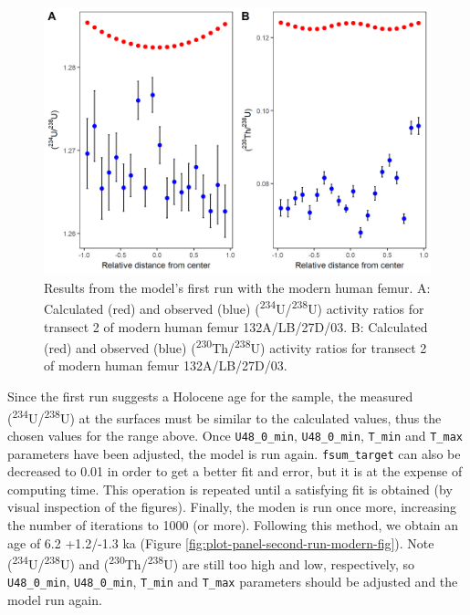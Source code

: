 \documentclass[]{elsarticle} %
\begin{document}
\begin{figure}
\includegraphics[width=0.95\linewidth]{figures/plot-panel-first-run-modern} \caption{Results from the model's first run with the modern human femur. A: Calculated (red) and observed (blue) (\textsuperscript{234}U/\textsuperscript{238}U) activity ratios for transect 2 of modern human femur 132A/LB/27D/03. B: Calculated (red) and observed (blue) (\textsuperscript{230}Th/\textsuperscript{238}U) activity ratios for transect 2 of modern human femur 132A/LB/27D/03.}\label{fig:plot-panel-first-run-modern-fig}
\end{figure}

\FloatBarrier

Since the first run suggests a Holocene age for the sample, the measured (\textsuperscript{234}U/\textsuperscript{238}U) at the surfaces must be similar to the calculated values, thus the chosen values for the range above. Once \texttt{U48\_0\_min}, \texttt{U48\_0\_min}, \texttt{T\_min} and \texttt{T\_max} parameters have been adjusted, the model is run again. \texttt{fsum\_target} can also be decreased to 0.01 in order to get a better fit and error, but it is at the expense of computing time. This operation is repeated until a satisfying fit is obtained (by visual inspection of the figures). Finally, the moden is run once more, increasing the number of iterations to 1000 (or more). Following this method, we obtain an age of 6.2 +1.2/-1.3 ka (Figure \ref{fig:plot-panel-second-run-modern-fig}). Note (\textsuperscript{234}U/\textsuperscript{238}U) and (\textsuperscript{230}Th/\textsuperscript{238}U) are still too high and low, respectively, so \texttt{U48\_0\_min}, \texttt{U48\_0\_min}, \texttt{T\_min} and \texttt{T\_max} parameters should be adjusted and the model run again.
\end{document}
